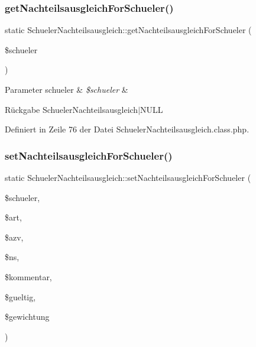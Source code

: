 \subsubsection{\texorpdfstring{get\+Nachteilsausgleich\+For\+Schueler()}{getNachteilsausgleichForSchueler()}}
{\footnotesize\ttfamily static Schueler\+Nachteilsausgleich\+::get\+Nachteilsausgleich\+For\+Schueler (\begin{DoxyParamCaption}\item[{}]{\$schueler }\end{DoxyParamCaption})\hspace{0.3cm}{\ttfamily [static]}}


\begin{DoxyParams}[1]{Parameter}
schueler & {\em \$schueler} & \\
\hline
\end{DoxyParams}
\begin{DoxyReturn}{Rückgabe}
Schueler\+Nachteilsausgleich$\vert$\+N\+U\+LL 
\end{DoxyReturn}


Definiert in Zeile 76 der Datei Schueler\+Nachteilsausgleich.\+class.\+php.

\mbox{\label{class_schueler_nachteilsausgleich_a9c2956fe6daf996e8004a6cc6de733b9}} 
\subsubsection{\texorpdfstring{set\+Nachteilsausgleich\+For\+Schueler()}{setNachteilsausgleichForSchueler()}}
{\footnotesize\ttfamily static Schueler\+Nachteilsausgleich\+::set\+Nachteilsausgleich\+For\+Schueler (\begin{DoxyParamCaption}\item[{}]{\$schueler,  }\item[{}]{\$art,  }\item[{}]{\$azv,  }\item[{}]{\$ns,  }\item[{}]{\$kommentar,  }\item[{}]{\$gueltig,  }\item[{}]{\$gewichtung }\end{DoxyParamCaption})\hspace{0.3cm}{\ttfamily [static]}}



